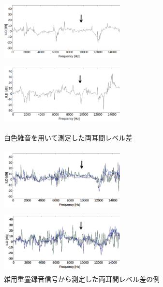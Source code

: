 \documentclass[autodetect-engine,dvi=dvipdfmx,ja=standard,twocolumn,jbase=13.35Q]{bxjsarticle}
\begin{document}
\begin{figure}[htbp]
     \begin{center}
          \includegraphics[clip, width=2.5in, height = 1.3in]{picture/mae_full_whitenoise.png}
          \includegraphics[clip, width=2.5in, height = 1.3in]{picture/usiro_full_whitenoise.png}
          \end{center}
          \caption{白色雑音を用いて測定した両耳間レベル差}\label{fig:whitenoiseILD}     
\end{figure}
\begin{figure}[htbp]
    
     \begin{center}
     \includegraphics[clip, width=2.5in, height = 1.3in]{picture/mae_full_NoSmoothing.png}
     
     \includegraphics[clip, width=2.5in, height = 1.3in]{picture/usiro_full_NoSmoothing.png}
     \end{center}
     \caption{雑用重畳録音信号から測定した両耳間レベル差の例}\label{fig:AILD}
\end{figure}
\end{document}
